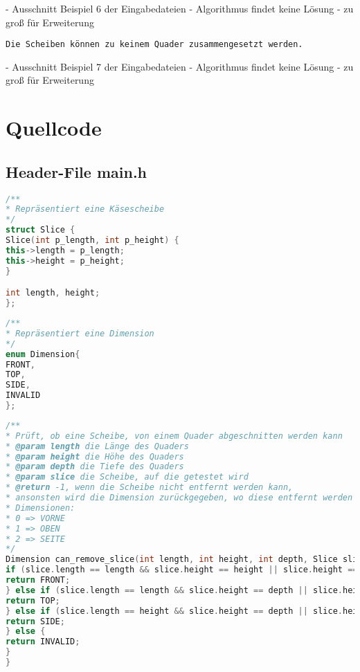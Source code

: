 \documentclass[a4paper,10pt,ngerman]{scrartcl}
\begin{document}
    - Ausschnitt Beispiel 6 der Eingabedateien
    - Algorithmus findet keine Lösung
    - zu groß für Erweiterung

    \begin{lstlisting}[frame=single, title=Programmausgabe kaese7.txt, breaklines=true,label={lst:lstlisting12}]
Die Scheiben können zu keinem Quader zusammengesetzt werden.
    \end{lstlisting}

    - Ausschnitt Beispiel 7 der Eingabedateien
    - Algorithmus findet keine Lösung
    - zu groß für Erweiterung


    \newpage


    \section{Quellcode}
    \label{sec:quellcode}
    \label{LastPage}

    \subsection{Header-File main.h}\label{subsec:header-file}

    \begin{lstlisting}[frame=single,language=C++,title=Struct Slice,breaklines=true,label={lst:code_slice}]
/**
* Repräsentiert eine Käsescheibe
*/
struct Slice {
Slice(int p_length, int p_height) {
this->length = p_length;
this->height = p_height;
}

int length, height;
};
    \end{lstlisting}

    \begin{lstlisting}[frame=single,language=C++,title=Enum Dimension,breaklines=true,label={lst:code_dimension}]
/**
* Repräsentiert eine Dimension
*/
enum Dimension{
FRONT,
TOP,
SIDE,
INVALID
};
    \end{lstlisting}

    \begin{lstlisting}[frame=single,language=C++,title=Methode can\_remove\_slice,breaklines=true,label={lst:code_canRemoveSlice}]
/**
* Prüft, ob eine Scheibe, von einem Quader abgeschnitten werden kann
* @param length die Länge des Quaders
* @param height die Höhe des Quaders
* @param depth die Tiefe des Quaders
* @param slice die Scheibe, auf die getestet wird
* @return -1, wenn die Scheibe nicht entfernt werden kann,
* ansonsten wird die Dimension zurückgegeben, wo diese entfernt werden kann
* Dimensionen:
* 0 => VORNE
* 1 => OBEN
* 2 => SEITE
*/
Dimension can_remove_slice(int length, int height, int depth, Slice slice) {
if (slice.length == length && slice.height == height || slice.height == length && slice.length == height) {
return FRONT;
} else if (slice.length == length && slice.height == depth || slice.height == length && slice.length == depth) {
return TOP;
} else if (slice.length == height && slice.height == depth || slice.height == height && slice.length == depth) {
return SIDE;
} else {
return INVALID;
}
}
    \end{lstlisting}
\end{document}
